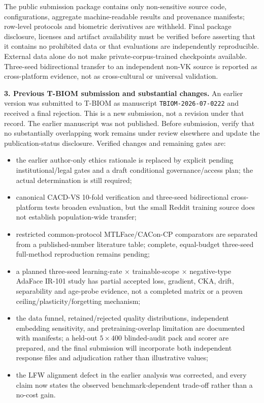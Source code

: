 \documentclass[11pt,a4paper]{article}
\begin{document}
The public submission package contains only non-sensitive source code, configurations, aggregate
machine-readable results and provenance manifests; row-level protocols and biometric derivatives
are withheld. Final package disclosure, licenses and artifact availability must be verified before
asserting that it contains no prohibited data or that evaluations are independently reproducible.
External data alone do not make private-corpus-trained checkpoints available. Three-seed bidirectional transfer to an independent
non-VK source is reported as cross-platform evidence, not as cross-cultural or universal validation.

\vspace{3mm}
\noindent\textbf{3. Previous T-BIOM submission and substantial changes.}
An earlier version was submitted to T-BIOM as manuscript \texttt{TBIOM-2026-07-0222} and received a
final rejection. This is a new submission, not a revision under that record. The earlier manuscript
was not published. Before submission, verify that no substantially overlapping work remains under
review elsewhere and update the publication-status disclosure. Verified changes and remaining gates are:

\begin{itemize}
\item the earlier author-only ethics rationale is replaced by explicit pending institutional/legal
      gates and a draft conditional governance/access plan; the actual determination is still required;
\item canonical CACD-VS 10-fold verification and three-seed bidirectional cross-platform tests
      broaden evaluation, but the small Reddit training source does not establish population-wide transfer;
\item restricted common-protocol MTLFace/CACon-CP comparators are separated from a published-number
      literature table; complete, equal-budget three-seed full-method reproduction remains pending;
\item a planned three-seed learning-rate $\times$ trainable-scope $\times$ negative-type AdaFace IR-101
      study has partial accepted loss, gradient, CKA, drift, separability and age-probe evidence,
      not a completed matrix or a proven ceiling/plasticity/forgetting mechanism;
\item the data funnel, retained/rejected quality distributions, independent embedding sensitivity,
      and pretraining-overlap limitation are documented with manifests; a held-out $5\times400$
      blinded-audit pack and scorer are prepared, and the final submission will incorporate both
      independent response files and adjudication rather than illustrative values;
\item the LFW alignment defect in the earlier analysis was corrected, and every claim now states the
      observed benchmark-dependent trade-off rather than a no-cost gain.
\end{itemize}
\end{document}
